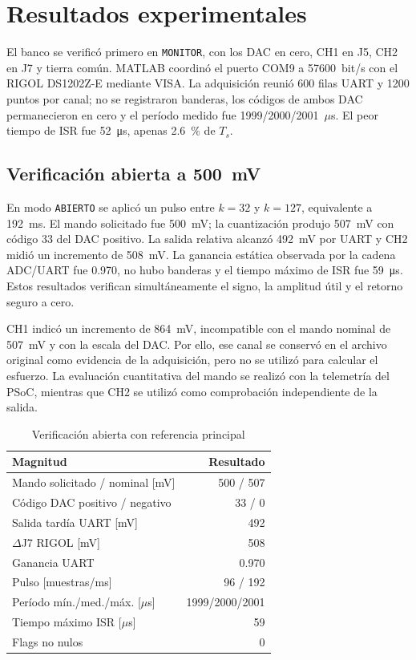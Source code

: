 \documentclass[conference]{IEEEtran}
\begin{document}
\section{Resultados experimentales}
\label{sec:experimental}
El banco se verificó primero en \texttt{MONITOR}, con los DAC en cero, CH1 en J5, CH2 en J7 y tierra común. MATLAB coordinó el puerto COM9 a 57600~bit/s con el RIGOL DS1202Z-E mediante VISA. La adquisición reunió 600 filas UART y 1200 puntos por canal; no se registraron banderas, los códigos de ambos DAC permanecieron en cero y el período medido fue 1999/2000/2001~$\mu$s. El peor tiempo de ISR fue \SI{52}{\micro s}, apenas \SI{2.6}{\percent} de $T_s$.

\subsection{Verificación abierta a \SI{500}{mV}}
En modo \texttt{ABIERTO} se aplicó un pulso entre $k=32$ y $k=127$, equivalente a \SI{192}{ms}. El mando solicitado fue \SI{500}{mV}; la cuantización produjo \SI{507}{mV} con código 33 del DAC positivo. La salida relativa alcanzó \SI{492}{mV} por UART y CH2 midió un incremento de \SI{508}{mV}. La ganancia estática observada por la cadena ADC/UART fue 0.970, no hubo banderas y el tiempo máximo de ISR fue \SI{59}{\micro s}. Estos resultados verifican simultáneamente el signo, la amplitud útil y el retorno seguro a cero.

CH1 indicó un incremento de \SI{864}{mV}, incompatible con el mando nominal de \SI{507}{mV} y con la escala del DAC. Por ello, ese canal se conservó en el archivo original como evidencia de la adquisición, pero no se utilizó para calcular el esfuerzo. La evaluación cuantitativa del mando se realizó con la telemetría del PSoC, mientras que CH2 se utilizó como comprobación independiente de la salida.

\begin{table}[!t]
\caption{Verificación abierta con referencia principal}
\label{tab:abierto-500}
\centering
\scriptsize
\begin{tabular}{lr}
\toprule
Magnitud & Resultado\\
\midrule
Mando solicitado / nominal [mV] & 500 / 507\\
Código DAC positivo / negativo & 33 / 0\\
Salida tardía UART [mV] & 492\\
$\Delta$J7 RIGOL [mV] & 508\\
Ganancia UART & 0.970\\
Pulso [muestras/ms] & 96 / 192\\
Período mín./med./máx. [$\mu$s] & 1999/2000/2001\\
Tiempo máximo ISR [$\mu$s] & 59\\
Flags no nulos & 0\\
\bottomrule
\end{tabular}
\end{table}
\end{document}
